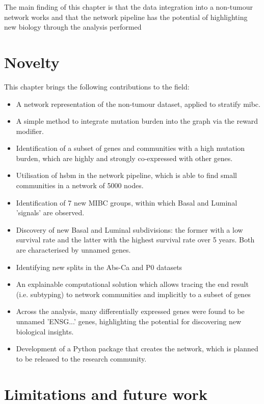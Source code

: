 The main finding of this chapter is that the data integration into a non-tumour network works and that the network pipeline has the potential of highlighting new biology through the analysis performed

\newpage

\section{Novelty}

This chapter brings the following contributions to the field:
\begin{itemize}
    \item A network representation of the non-tumour dataset, applied to stratify \acrfull{mibc}.
    \item A simple method to integrate mutation burden into the graph via the reward modifier.
    \item Identification of a subset of genes and communities with a high mutation burden, which are highly and strongly co-expressed with other genes.
    \item Utilisation of \acrfull{hsbm} in the network pipeline, which is able to find small communities in a network of 5000 nodes.
    \item Identification of 7 new MIBC groups, within which Basal and Luminal 'signals' are observed.
    \item Discovery of new Basal and Luminal subdivisions: the former with a low survival rate and the latter with the highest survival rate over 5 years. Both are characterised by unnamed genes.
    \item Identifying new splits in the Abs-Ca and P0 datasets
    \item An explainable computational solution which allows tracing the end result (i.e. subtyping) to network communities and implicitly to a subset of genes
    \item Across the analysis, many differentially expressed genes were found to be unnamed 'ENSG...' genes, highlighting the potential for discovering new biological insights.
    \item Development of a Python package that creates the network, which is planned to be released to the research community.
\end{itemize}


\newpage 


\section{Limitations and future work }

